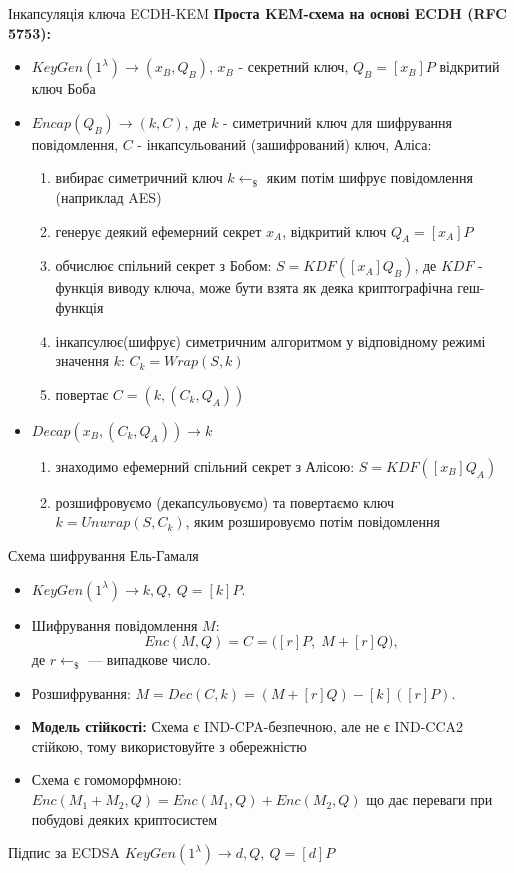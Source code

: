 \documentclass[9pt]{beamer}
\begin{document}
\begin{darkframes}
\begin{frame}{Інкапсуляція ключа ECDH-KEM}
      \textbf{Проста KEM-схема на основі ECDH (RFC 5753):}
  \begin{itemize}
  \item $KeyGen(1^\lambda) \rightarrow (x_B, Q_B)$, $x_B$ - секретний ключ, $Q_B=[x_B]P$ відкритий ключ Боба
  \item $Encap(Q_B) \rightarrow (k, C)$, де $k$ - симетричний ключ для шифрування повідомлення, $C$ - інкапсульований (зашифрований) ключ, Аліса:
  \begin{enumerate}
      \item вибирає симетричний ключ $k\leftarrow_\$$ яким потім шифрує повідомлення (наприклад AES)
      \item генерує деякий ефемерний секрет $x_A$, відкритий ключ $Q_A=[x_A]P$
      \item обчислює спільний секрет з Бобом: $S=KDF([x_A]Q_B)$, де $KDF$ - функція виводу ключа, може бути взята як деяка криптографічна геш-функція
      \item інкапсулює(шифрує) симетричним алгоритмом у відповідному режимі значення $k$: $C_k = Wrap(S, k)$
      \item повертає $C=(k, (C_k, Q_A))$
  \end{enumerate}
  \item $Decap(x_B, (C_k, Q_A)) \rightarrow k$
  \begin{enumerate}
      \item знаходимо ефемерний спільний секрет з Алісою: $S=KDF([x_B]Q_A)$
      \item розшифровуємо (декапсульовуємо) та повертаємо ключ $k=Unwrap(S,C_k)$, яким розшировуємо потім повідомлення
  \end{enumerate}
  \end{itemize}
\end{frame}
\begin{frame}{Схема шифрування Ель-Гамаля}

\begin{itemize}
    \item $KeyGen(1^\lambda) \rightarrow k, Q,\ Q=[k]P$.
    \item Шифрування повідомлення \(M\):
      \[
      Enc(M, Q) = C = \bigl([r]P,\; M + [r]Q\bigr),
      \]
      де \(r \leftarrow_\$\) --- випадкове число.
    \item Розшифрування: \( M =Dec(C, k) = (M + [r]Q) - [k]([r]P)\).
    \item \textbf{Модель стійкості:} Схема є IND-CPA-безпечною, але не є IND-CCA2 стійкою, тому використовуйте з обережністю
    \item Схема є гомоморфмною: $Enc(M_1+M_2,Q)=Enc(M_1,Q)+Enc(M_2,Q)$ що дає переваги при побудові деяких криптосистем
  \end{itemize}
\end{frame}
\begin{frame}{Підпис за ECDSA}
  $KeyGen(1^\lambda) \rightarrow d, Q,\ Q=[d]P$


\end{frame}
\end{darkframes}
\end{document}
